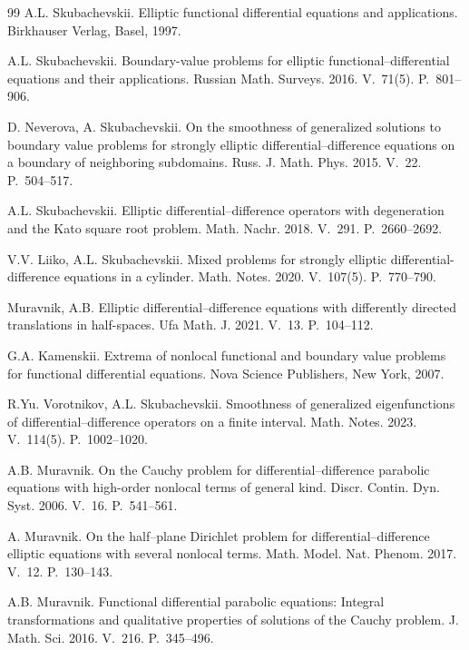 \documentclass[10pt, a4paper]{article}
\theoremstyle{plain}
\theoremstyle{definition}
\numberwithin{equation}{section}
\begin{document}
\begin{thebibliography}{99}
A.L. Skubachevskii. Elliptic functional differential equations and applications.
Birkhauser Verlag, Basel, 1997.

A.L. Skubachevskii. Boundary-value problems for elliptic functional--differential
equations and their applications. Russian Math. Surveys. 2016. V.~71(5). P.~801--906.

D. Neverova, A. Skubachevskii. On the smoothness of generalized solutions to boundary
value problems for strongly elliptic differential--difference equations on a
boundary of neighboring subdomains. Russ. J. Math. Phys. 2015. V.~22. P.~504--517.

A.L. Skubachevskii. Elliptic differential--difference operators with degeneration
and the Kato square root problem. Math. Nachr. 2018. V.~291. P.~2660--2692.

V.V. Liiko, A.L. Skubachevskii. Mixed problems for strongly elliptic
differential-difference equations in a cylinder. Math. Notes. 2020. V.~107(5). P.~770--790.

Muravnik, A.B. Elliptic differential--difference equations with differently directed
translations in half-spaces. Ufa Math. J. 2021. V.~13. P.~104--112.

G.A. Kamenskii. Extrema of nonlocal functional and boundary value problems for
functional differential equations. Nova Science Publishers, New York, 2007.

R.Yu. Vorotnikov, A.L. Skubachevskii. Smoothness of generalized eigenfunctions of
differential--difference operators on a finite interval. Math. Notes. 2023. V.~114(5).
P.~1002--1020.

A.B. Muravnik. On the Cauchy problem for differential--difference parabolic
equations with high-order nonlocal terms of general kind. Discr. Contin.
Dyn. Syst. 2006. V.~16. P.~541--561.

A. Muravnik. On the half--plane Dirichlet problem for differential--difference
elliptic equations with several nonlocal terms. Math.
Model. Nat. Phenom. 2017. V.~12. P.~130--143.

A.B. Muravnik. Functional differential parabolic equations: Integral transformations
and qualitative properties of solutions of the Cauchy problem. J. Math. Sci.
2016. V.~216. P.~345--496.


\end{thebibliography}
\end{document}
